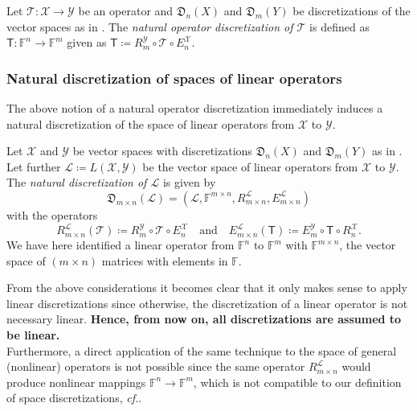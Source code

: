 \documentclass[a4paper]{paper}
\newcommand*{\SPC}[1]{{\ensuremath{\mathscr{#1}}}}
\newcommand*{\SPCL}{\SPC{L}}
\newcommand*{\SPCX}{\SPC{X}}
\newcommand*{\SPCY}{\SPC{Y}}
\newcommand*{\LINOP}[2]{{L(#1, #2)}}
\newcommand*{\FIELD}{{\ensuremath{\mathbb{F}}}}
\newcommand*{\Fn}{{\ensuremath{\FIELD^n}}}
\newcommand*{\Fm}{{\ensuremath{\FIELD^m}}}
\newcommand*{\Fmxn}{{\ensuremath{\FIELD^{m \times n}}}}
\newcommand*{\OP}[1]{{\ensuremath{\mathcal{#1}}}}
\newcommand*{\OPT}{\OP{T}}
\newcommand{\DISCOP}[1]{{\ensuremath{\mathsf{#1}}}}
\newcommand*{\DISCOPT}{\DISCOP{T}}
\newcommand*{\EXT}[2]{\ensuremath{E_{#1}^{#2}}}
\newcommand*{\REST}[2]{\ensuremath{R_{#1}^{#2}}}
\newcommand*{\RnX}{{\ensuremath{\REST{n}{\SPC{X}}}}}
\newcommand*{\RmY}{{\ensuremath{\REST{m}{\SPC{Y}}}}}
\newcommand*{\EnX}{{\ensuremath{\EXT{n}{\SPC{X}}}}}
\newcommand*{\EmY}{{\ensuremath{\EXT{m}{\SPC{Y}}}}}
\newcommand*{\DISCR}[2]{{\ensuremath{\mathfrak{D}_{#1}(#2)}}}
\newcommand*{\DISCRnX}{\DISCR{n}{X}}
\newcommand*{\DISCRmY}{\DISCR{m}{Y}}
\DeclareMathOperator{\DEFEQ}{{\coloneqq}}
\newcommand*{\cf}{\textsl{cf.}\xspace}
\begin{document}
\begin{definition}
 \label{def:discr:operator:operator_discr}
 Let $\OPT\colon \SPCX \to \SPCY$ be an operator and $\DISCRnX$ and $\DISCRmY$ be 
 discretizations of the vector spaces as in . The 
 \emph{natural operator discretization of $\OPT$} is defined as $\DISCOPT \colon \Fn \to \Fm$ given as 
 $\DISCOPT \DEFEQ  \RmY \circ \OPT \circ \EnX$.
\end{definition}


\subsubsection{Natural discretization of spaces of linear operators}
\label{subsubsec:discr:operator:linop_space}

The above notion of a natural operator discretization immediately induces a natural discretization of the space of 
linear operators from $\SPCX$ to $\SPCY$.

\begin{definition}
 \label{def:discr:operator:linop_space:linop_space_discr}
 Let $\SPCX$ and $\SPCY$ be vector spaces with discretizations $\DISCRnX$ and $\DISCRmY$ 
 as in . Let further $\SPCL \DEFEQ  \LINOP{\SPCX}{\SPCY}$ be the 
 vector space of linear operators from $\SPCX$ to $\SPCY$. The \emph{natural discretization of $\SPCL$} is 
 given by
 \begin{equation*}
  \DISCR{m\times n}{\SPCL} = \left( \SPCL, \Fmxn, \REST{m\times n}{\SPCL}, \EXT{m\times n}{\SPCL}
  \right)
 \end{equation*}
 with the operators
 \begin{equation*}
  \REST{m\times n}{\SPCL}(\OPT) \DEFEQ  \RmY \circ \OPT \circ \EnX
  \quad\text{and}\quad
  \EXT{m\times n}{\SPCL}(\DISCOPT) \DEFEQ  \EmY \circ \DISCOPT \circ \RnX.
 \end{equation*}
 We have here identified a linear operator from $\Fn$ to $\Fm$ with $\Fmxn$, the vector space 
 of $(m \times n)$ matrices with elements in $\FIELD$.
\end{definition}

\begin{remark}
 From the above considerations it becomes clear that it only makes sense to apply linear discretizations since 
 otherwise, the discretization of a linear operator is not necessary linear. \textbf{Hence, from now on, all 
 discretizations are assumed to be linear.}\\
 Furthermore, a direct application of the same technique to the space of general (nonlinear) operators is not possible 
 since the same operator $\REST{m\times n}{\SPCL}$ would produce nonlinear mappings $\Fn \to \Fm$, which is 
 not compatible to our definition of space discretizations, \cf {}.
\end{remark}
\end{document}
